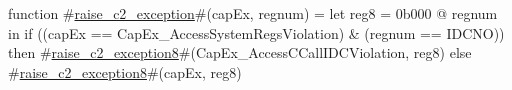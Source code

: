 function #\hyperref[zraisezyctwozyexception]{raise\_c2\_exception}#(capEx, regnum) =
  let reg8 = 0b000 @ regnum in
  if ((capEx == CapEx_AccessSystemRegsViolation) & (regnum == IDCNO)) then
     #\hyperref[zraisezyctwozyexceptioneight]{raise\_c2\_exception8}#(CapEx_AccessCCallIDCViolation, reg8)
  else
     #\hyperref[zraisezyctwozyexceptioneight]{raise\_c2\_exception8}#(capEx, reg8)
